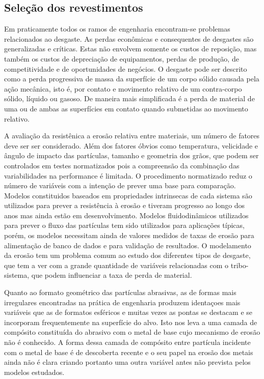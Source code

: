 \subsection{Seleção dos revestimentos}

Em praticamente todos os ramos de engenharia encontram-se problemas relacionados
ao desgaste. As perdas econômicas e consequentes de desgastes são generalizadas
e críticas. Estas não envolvem somente os custos de reposição, mas também os
custos de depreciação de equipamentos, perdas de produção, de competitividade e
de oportunidades de negócios.
O desgaste pode ser descrito como a perda progressiva de massa da superfície de
um corpo sólido causada pela ação mecânica, isto é, por contato e movimento
relativo de um contra-corpo sólido, líquido ou gasoso. De maneira mais
simplificada é a perda de material de uma ou de ambas as superfícies em contato
quando submetidas ao movimento relativo.

A avaliação da resistênica a erosão relativa entre materiais, um número de
fatores deve ser ser considerado. Além dos fatores óbvios como temperatura,
velicidade  e ângulo de impacto das partículas, tamanho e geometria dos grãos,
que podem ser controlados em testes normatizados pois a compreensão da
combinação das variabilidades  na performance é limitada.
O procedimento normatizado reduz o número de variáveis com a intenção de prever
uma base para comparação.
Modelos constituidos baseados em propriedades intrinsecas de cada sistema são
utilizados para prever a resistência à erosão e tiveram progresso ao longo dos
anos mas ainda estão em desenvolvimento. Modelos fluidodinâmicos utilizados para
prever o fluxo das partículas tem sido utilizados para aplicações típicas,
porém, os modelos necessitam ainda de valores medidos de taxas de erosão para
alimentação de banco de dados e para validação de resultados. O modelamento da
erosão tem um problema comum ao estudo dos diferentes tipos de desgaste, que tem
a ver com a grande quantidade de variáveis relacionadas com o tribo-sistema, que
podem influenciar a taxa de perda de material.

Quanto ao formato geométrico das partículas abrasivas, as de formas mais
irregulares encontradas na prática de engenharia produzem identaçoes mais
variáveis que as de formatos esféricos e muitas vezes as pontas se destacam e
se incorporam frequentemente  na superfície do alvo. Isto nos leva a uma camada
de compósito constituída do abrasivo com o metal de base cujo mecanismo de
erosão não é conhecido. A forma dessa camada de compósito entre partícula
incidente com o metal de base é de descoberta recente e o seu papel na erosão
dos metais ainda não é clara criando portanto uma outra variável antes não
prevista pelos modelos estudados.

